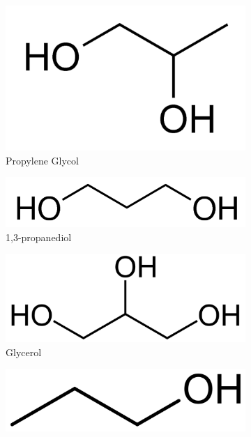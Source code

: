 \begin{figure}[h!]
    \centering
    \begin{subfigure}[b]{0.3\linewidth}
      \includegraphics[width=\linewidth]{prplene.png}
       \caption{Propylene Glycol}
    \end{subfigure}
    \begin{subfigure}[b]{0.3\linewidth}
      \includegraphics[width=\linewidth]{13prop.png}
      \caption{1,3-propanediol}
    \end{subfigure}
    \begin{subfigure}[b]{0.3\linewidth}
        \includegraphics[width=\linewidth]{glycerol.png}
        \caption{Glycerol}
      \end{subfigure}
    \begin{subfigure}[b]{0.3\linewidth}
      \includegraphics[width=\linewidth]{1prop.png}

\end{subfigure}
\end{figure}
